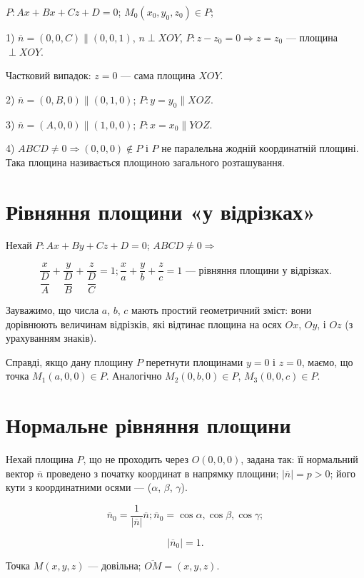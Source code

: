 $P: Ax + Bx + Cz + D = 0$; $M_0(x_0,y_0,z_0) \in P$;

1) $\overline{n} = (0,0,C) \parallel (0,0,1)$, $n \perp XOY$,
$P : z - z_0 = 0 \Rightarrow z = z_0$ --- площина $\perp XOY$.

Частковий випадок: $z = 0$ --- сама площина $XOY$.

2) $\overline{n} = (0,B,0) \parallel (0,1,0)$; $P: y = y_0 \parallel XOZ$.

3) $\overline{n} = (A,0,0) \parallel (1,0,0)$; $P: x = x_0 \parallel YOZ$.

4) $ABCD \neq 0 \Rightarrow (0,0,0) \notin P$ і $P$ не паралельна жодній координатній
площині. Така площина називається площиною загального розташування.


\section{Рівняння площини «у відрізках»}

Нехай $P: Ax + By + Cz + D = 0$; $ABCD \neq 0 \Rightarrow$

$$\dfrac{x}{\dfrac{D}{A}} + \dfrac{y}{\dfrac{D}{B}} + \dfrac{z}{\dfrac{D}{C}} = 1;
\dfrac{x}{a} + \dfrac{y}{b} + \dfrac{z}{c} = 1
\text{ --- рівняння площини у відрізках}.$$


Зауважимо, що числа $a$, $b$, $c$ мають простий геометричний зміст: вони
дорівнюють величинам відрізків, які відтинає площина на осях $Ox$, $Oy$, і
$Oz$ (з урахуванням знаків).

Справді, якщо дану площину $P$
перетнути площинами $y = 0$ і $z = 0$,
маємо, що точка $M_1(a,0,0) \in P$.
Аналогічно $M_2(0,b,0) \in P$,
$M_3(0,0,c) \in P$.


\section{Нормальне рівняння площини}

Нехай площина $P$, що не
проходить через $O(0,0,0)$, задана так:
її нормальний вектор $\overline{n}$ проведено з
початку координат в напрямку
площини; $|\overline{n}| = p > 0$; його кути з
координатними осями --- ($\alpha$, $\beta$, $\gamma$).

$$\overline{n}_0 = \dfrac{1}{|\overline{n}|}\overline{n}; \overline{n}_0 = {\cos \alpha, \cos \beta, \cos\gamma};$$

$$|\overline{n}_0| = 1.$$

Точка $M(x,y,z)$ --- довільна; $\overline{OM} = (x, y,z)$.

